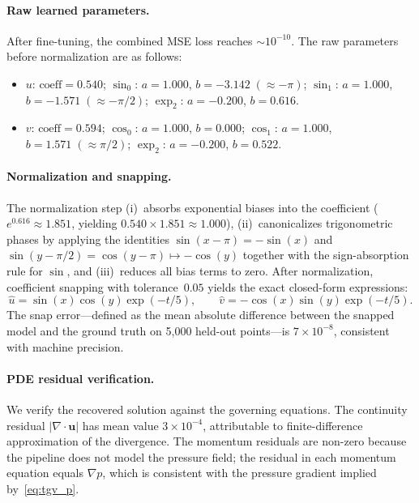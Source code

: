 \paragraph{Raw learned parameters.}
After fine-tuning, the combined MSE loss reaches $\sim\!10^{-10}$.  The raw
parameters before normalization are as follows:
\begin{itemize}
  \item $u$: $\text{coeff}=0.540$;\;
        $\sin_0$: $a\!=\!1.000$, $b\!=\!{-3.142}\;(\approx -\pi)$;\;
        $\sin_1$: $a\!=\!1.000$, $b\!=\!{-1.571}\;(\approx -\pi/2)$;\;
        $\exp_2$: $a\!=\!{-0.200}$, $b\!=\!0.616$.
  \item $v$: $\text{coeff}=0.594$;\;
        $\cos_0$: $a\!=\!1.000$, $b\!=\!0.000$;\;
        $\cos_1$: $a\!=\!1.000$, $b\!=\!1.571\;(\approx \pi/2)$;\;
        $\exp_2$: $a\!=\!{-0.200}$, $b\!=\!0.522$.
\end{itemize}

\paragraph{Normalization and snapping.}
The normalization step (i)~absorbs exponential biases into the coefficient
($e^{0.616}\approx 1.851$, yielding $0.540 \times 1.851 \approx 1.000$),
(ii)~canonicalizes trigonometric phases by applying the identities
$\sin(x-\pi)=-\sin(x)$ and $\sin(y-\pi/2)=\cos(y-\pi)\mapsto -\cos(y)$
together with the sign-absorption rule for $\sin$, and
(iii)~reduces all bias terms to zero.
After normalization, coefficient snapping with tolerance~$0.05$ yields the
exact closed-form expressions:
\begin{equation}
  \hat{u} = \sin(x)\cos(y)\exp(-t/5), \qquad
  \hat{v} = -\cos(x)\sin(y)\exp(-t/5).
  \label{eq:recovered}
\end{equation}
The snap error---defined as the mean absolute difference between the snapped
model and the ground truth on 5{,}000 held-out points---is $7\times10^{-8}$,
consistent with machine precision.

\paragraph{PDE residual verification.}
We verify the recovered solution against the governing equations.  The
continuity residual $|\nabla\!\cdot\!\mathbf{u}|$ has mean value
$3\times10^{-4}$, attributable to finite-difference approximation of the
divergence.  The momentum residuals are non-zero because the pipeline does not
model the pressure field; the residual in each momentum equation equals
$\nabla p$, which is consistent with the pressure
gradient implied by~\eqref{eq:tgv_p}.

